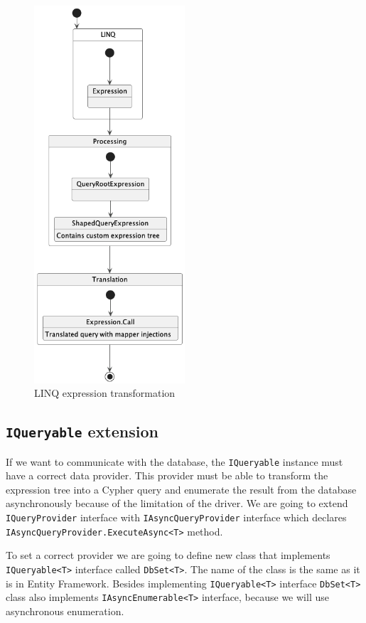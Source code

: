 \begin{figure}[H]
    \centering
    \includegraphics[width=0.5\textwidth]{content/Expression transformation.png}
    \caption{LINQ expression transformation}
    \label{fig:querystate}
\end{figure}

\subsection{\texttt{IQueryable} extension}

If we want to communicate with the database, the \texttt{IQueryable} instance must have a correct data provider.
This provider must be able to transform the expression tree into a Cypher query and enumerate the result from the database asynchronously because of the limitation of the driver.
We are going to extend \texttt{IQueryProvider} interface with \texttt{IAsyncQueryProvider} interface which declares \texttt{IAsyncQueryProvider.ExecuteAsync<T>} method.

To set a correct provider we are going to define new class that implements \texttt{IQueryable<T>} interface called \texttt{DbSet<T>}.
The name of the class is the same as it is in Entity Framework.
Besides implementing \texttt{IQueryable<T>} interface \texttt{DbSet<T>} class also implements \texttt{IAsyncEnumerable<T>} interface, because we will use asynchronous enumeration.

